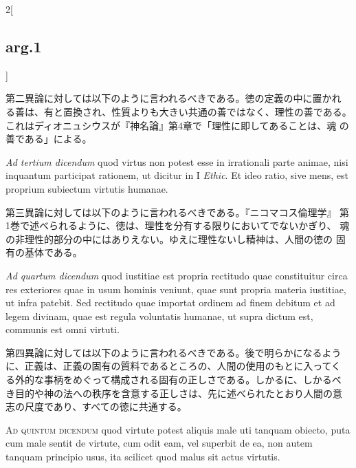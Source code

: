 \documentclass[paper=a4paper,fontsize=10pt,jafontsize=9pt,titlepage]{jlreq}
\begin{document}
\begin{paracol}{2}[\subsection{arg.1}]
\switchcolumn

第二異論に対しては以下のように言われるべきである。徳の定義の中に置かれ
る善は、有と置換され、性質よりも大きい共通の善ではなく、理性の善である。
これはディオニュシウスが『神名論』第4章で「理性に即してあることは、魂
の善である」による。

\switchcolumn*[\subsection{ad.3}]

{\itshape Ad tertium dicendum} quod virtus non potest esse in
irrationali parte animae, nisi inquantum participat rationem, ut
dicitur in I {\itshape Ethic}. Et ideo ratio, sive mens, est proprium
subiectum virtutis humanae.

\switchcolumn

第三異論に対しては以下のように言われるべきである。『ニコマコス倫理学』
第1巻で述べられるように、徳は、理性を分有する限りにおいてでないかぎり、
魂の非理性的部分の中にはありえない。ゆえに理性ないし精神は、人間の徳の
固有の基体である。

\switchcolumn*[\subsection{ad.4}]

{\itshape Ad quartum dicendum} quod iustitiae est propria rectitudo
quae constituitur circa res exteriores quae in usum hominis veniunt,
quae sunt propria materia iustitiae, ut infra patebit. Sed rectitudo
quae importat ordinem ad finem debitum et ad legem divinam, quae est
regula voluntatis humanae, ut supra dictum est, communis est omni
virtuti.

\switchcolumn

第四異論に対しては以下のように言われるべきである。後で明らかになるよう
に、正義は、正義の固有の質料であるところの、人間の使用のもとに入ってく
る外的な事柄をめぐって構成される固有の正しさである。しかるに、しかるべ
き目的や神の法への秩序を含意する正しさは、先に述べられたとおり人間の意
志の尺度であり、すべての徳に共通する。

\switchcolumn*[\subsection{ad.5}]

{\scshape Ad quintum dicendum} quod virtute potest aliquis male uti
tanquam obiecto, puta cum male sentit de virtute, cum odit eam, vel
superbit de ea, non autem tanquam principio usus, ita scilicet quod
malus sit actus virtutis.


\end{paracol}
\end{document}
